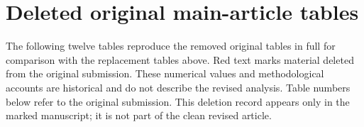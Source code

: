 
\clearpage
\section*{Deleted original main-article tables}
The following twelve tables reproduce the removed original tables in full for
comparison with the replacement tables above. Red text marks material deleted
from the original submission. These numerical values and methodological accounts
are historical and do not describe the revised analysis. Table numbers below
refer to the original submission. This deletion record appears only in the
marked manuscript; it is not part of the clean revised article.
\begingroup
\singlespacing
\color{red!70!black}
\setcounter{table}{0}
\renewcommand{\thetable}{Original \arabic{table}}
\renewcommand{\theHtable}{deletedoriginal.\arabic{table}}

\begin{table}[H]\color{red!70!black}
\centering
\caption{Null-model validation statistics for whole-brain coevolutionary energy. After unified
outlier removal, 78 ASD and 86 TD participants remained. For each subject, empirical energy was
compared to the mean energy from topology-preserving null networks in which node states and edge
signs were randomly permuted. Shapiro--Wilk tests confirmed normality of the difference
distributions, justifying the use of paired $t$-tests alongside Wilcoxon signed-rank tests.}
\label{deletedoriginal:tab:null_model_validation}
\small
{}
\end{table}
\clearpage

